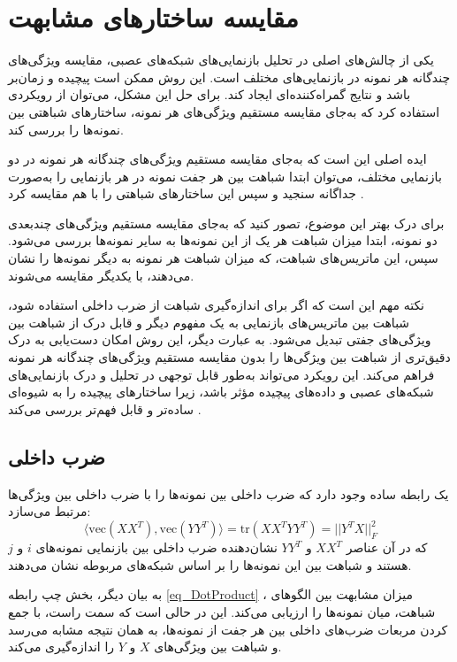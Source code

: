 \section{مقایسه ساختارهای مشابهت}
یکی از چالش‌های اصلی در تحلیل بازنمایی‌های شبکه‌های عصبی، مقایسه ویژگی‌های چندگانه هر نمونه در بازنمایی‌های مختلف است. این روش ممکن است پیچیده و زمان‌بر باشد و نتایج گمراه‌کننده‌ای ایجاد کند. برای حل این مشکل، می‌توان از رویکردی استفاده کرد که به‌جای مقایسه مستقیم ویژگی‌های هر نمونه، ساختارهای شباهتی بین نمونه‌ها را بررسی کند.

ایده اصلی این است که به‌جای مقایسه مستقیم ویژگی‌های چندگانه هر نمونه در دو بازنمایی مختلف، می‌توان ابتدا شباهت بین هر جفت نمونه در هر بازنمایی را به‌صورت جداگانه سنجید و سپس این ساختارهای شباهتی را با هم مقایسه کرد
\cite{kornblith2019similarity}.

برای درک بهتر این موضوع، تصور کنید که به‌جای مقایسه مستقیم ویژگی‌های چندبعدی دو نمونه، ابتدا میزان شباهت هر یک از این نمونه‌ها به سایر نمونه‌ها بررسی می‌شود. سپس، این ماتریس‌های شباهت، که میزان شباهت هر نمونه به دیگر نمونه‌ها را نشان می‌دهند، با یکدیگر مقایسه می‌شوند.

نکته مهم این است که اگر برای اندازه‌گیری شباهت از ضرب داخلی استفاده شود، شباهت بین ماتریس‌های بازنمایی به یک مفهوم دیگر و قابل درک از شباهت بین ویژگی‌های جفتی تبدیل می‌شود. به عبارت دیگر، این روش امکان دست‌یابی به درک دقیق‌تری از شباهت بین ویژگی‌ها را بدون مقایسه مستقیم ویژگی‌های چندگانه هر نمونه فراهم می‌کند. این رویکرد می‌تواند به‌طور قابل توجهی در تحلیل و درک بازنمایی‌های شبکه‌های عصبی و داده‌های پیچیده مؤثر باشد، زیرا ساختارهای پیچیده را به شیوه‌ای ساده‌تر و قابل فهم‌تر بررسی می‌کند
\cite{kornblith2019similarity}.



\subsection{
	ضرب داخلی%
}
یک رابطه ساده وجود دارد که ضرب داخلی بین نمونه‌ها را با ضرب داخلی بین ویژگی‌ها مرتبط می‌سازد:
\begin{equation}
	\langle \text{vec}(XX^T), \text{vec}(YY^T) \rangle = \text{tr}(XX^TYY^T) = ||Y^TX||_F^2
	\label{eq_DotProduct}
\end{equation}
که در آن عناصر \(XX^T\) و \(YY^T\) نشان‌دهنده ضرب داخلی بین بازنمایی نمونه‌های \(i\) و \(j\) هستند و شباهت بین این نمونه‌ها را بر اساس شبکه‌های مربوطه نشان می‌دهند. 

به بیان دیگر، بخش چپ رابطه
\eqref{eq_DotProduct}%
، میزان مشابهت بین الگوهای شباهت، میان نمونه‌ها را ارزیابی می‌کند. این در حالی است که سمت راست، با جمع کردن مربعات ضرب‌های داخلی بین هر جفت از نمونه‌ها، به همان نتیجه مشابه می‌رسد و شباهت بین ویژگی‌های \(X\) و \(Y\) را اندازه‌گیری می‌کند.

